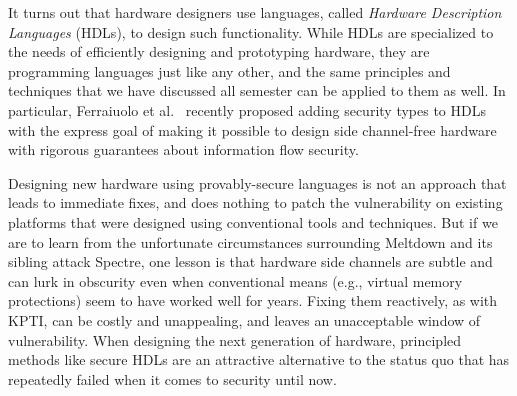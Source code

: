 \documentclass[11pt,twoside]{scrartcl}
\begin{document}
It turns out that hardware designers use languages, called \emph{Hardware Description Languages} (HDLs), to design such functionality. While HDLs are specialized to the needs of efficiently designing and prototyping hardware, they are programming languages just like any other, and the same principles and techniques that we have discussed all semester can be applied to them as well. In particular, Ferraiuolo et al.~\cite{Ferraiuolo2017} recently proposed adding security types to HDLs with the express goal of making it possible to design side channel-free hardware with rigorous guarantees about information flow security. 

Designing new hardware using provably-secure languages is not an approach that leads to immediate fixes, and does nothing to patch the vulnerability on existing platforms that were designed using conventional tools and techniques. But if we are to learn from the unfortunate circumstances surrounding Meltdown and its sibling attack Spectre, one lesson is that hardware side channels are subtle and can lurk in obscurity even when conventional means (e.g., virtual memory protections) seem to have worked well for years. Fixing them reactively, as with KPTI, can be costly and unappealing, and leaves an unacceptable window of vulnerability. When designing the next generation of hardware, principled methods like secure HDLs are an attractive alternative to the status quo that has repeatedly failed when it comes to security until now.



\end{document}
